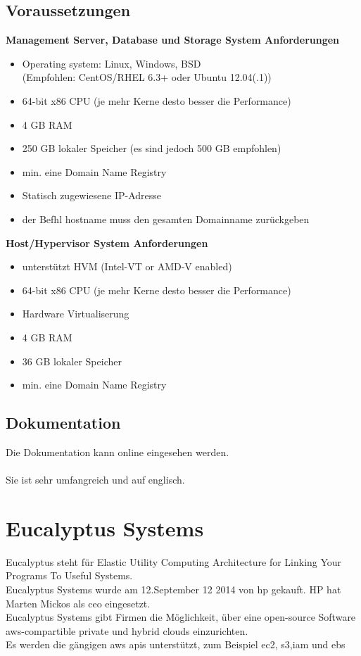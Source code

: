 \documentclass[a4paper,nochapterprefix,english,12pt]{scrreprt}
\begin{document}
\section{Voraussetzungen \cite{apachereq}}
\textbf{Management Server, Database und Storage System Anforderungen}
\begin{itemize}
\item Operating system: Linux, Windows, BSD \\
(Empfohlen: CentOS/RHEL 6.3+ oder Ubuntu 12.04(.1))
\item 64-bit x86 CPU (je mehr Kerne desto besser die Performance)
\item 4 GB RAM
\item 250 GB lokaler Speicher (es sind jedoch 500 GB empfohlen)
\item min. eine Domain Name Registry
\item Statisch zugewiesene IP-Adresse
\item der Befhl hostname muss den gesamten Domainname zurückgeben\\
\end{itemize}
\textbf{Host/Hypervisor System Anforderungen}
\begin{itemize}
	\item unterstützt HVM (Intel-VT or AMD-V enabled)
	\item 64-bit x86 CPU (je mehr Kerne desto besser die Performance)
	\item Hardware Virtualiserung
	\item 4 GB RAM
	\item 36 GB lokaler Speicher
	\item min. eine Domain Name Registry\\
\end{itemize}

\section{Dokumentation}
Die Dokumentation kann online \cite{apachedoc} eingesehen werden.\\\\
Sie ist sehr umfangreich und auf englisch.

\chapter{Eucalyptus Systems} \thispagestyle{fancy}
Eucalyptus steht für Elastic Utility Computing Architecture for Linking Your Programs To Useful Systems. \cite{EucalyptusSlideShare}\\
Eucalyptus Systems wurde am 12.September 12 2014 von \gls{hp} gekauft. \cite{eucHP2}
HP hat Marten Mickos als \gls{ceo} eingesetzt. \cite{eucHP1}
\\
Eucalyptus Systems gibt Firmen die Möglichkeit, über eine open-source Software \gls{aws}-compartible private und hybrid clouds einzurichten. \\
Es werden die gängigen \gls{aws} \gls{api}s unterstützt, zum Beispiel \gls{ec2}, \gls{s3},\gls{iam} und \gls{ebs}
\cite{eucHP2}
\end{document}
